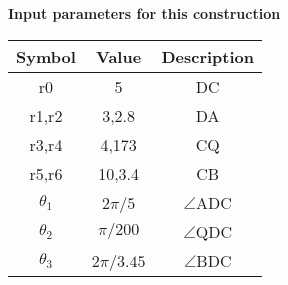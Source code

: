 \documentclass[journal,12pt,twocolumn]{IEEEtran}
\begin{document}
\begin{flushleft}

\newpage
\textbf{Input parameters for this construction}
\begin{center}
\begin{tabular}{|c|c|c|}
\hline
\textbf{Symbol}&{Value}&{Description}\\
\hline
r0&5&DC\\
\hline
r1,r2&3,2.8&DA\\
\hline
r3,r4&4,173&CQ\\
\hline
r5,r6&10,3.4&CB\\
\hline
${\theta}_1$& 2$\pi/5$&$ \angle $ADC\\ 
\hline
${\theta}_2$& $\pi/200$&$ \angle $QDC\\ 
\hline
${\theta}_3$& 2$\pi/3.45$&$ \angle $BDC\\ 
\hline 
\end{tabular}
\end{center}


\end{flushleft}
\end{document}
